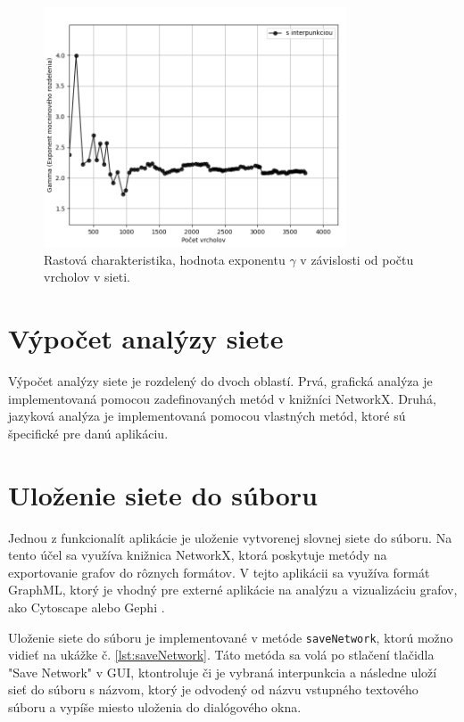 \begin{figure}
    \centerline{\includegraphics[width=0.8\textwidth]{images/growthPlot.png}}
    \caption[Rastová charakteristika, hodnota exponentu $\gamma$ v závislosti od počtu vrcholov v sieti.]{Rastová charakteristika, hodnota exponentu $\gamma$ v závislosti od počtu vrcholov v sieti.}
    \label{obr:growthPlot}
\end{figure}

\section{Výpočet analýzy siete}\label{sec:calculationOfNetworkAnalysis}

Výpočet analýzy siete je rozdelený do dvoch oblastí. Prvá, grafická analýza je implementovaná pomocou zadefinovaných
metód v knižníci NetworkX. Druhá, jazyková analýza je implementovaná pomocou vlastných metód,
ktoré sú špecifické pre danú aplikáciu.

\section{Uloženie siete do súboru}\label{sec:savingNetworkToFile}

Jednou z funkcionalít aplikácie je uloženie vytvorenej slovnej siete do súboru. Na tento účel sa využíva knižnica NetworkX,
ktorá poskytuje metódy na exportovanie grafov do rôznych formátov. V tejto aplikácii sa využíva formát GraphML, ktorý je
vhodný pre externé aplikácie na analýzu a vizualizáciu grafov, ako Cytoscape \cite{cytoscape_website}
alebo Gephi \cite{gephi_website}. 

Uloženie siete do súboru je implementované v metóde \texttt{saveNetwork}, ktorú možno
vidieť na ukážke č. \ref{lst:saveNetwork}. Táto metóda sa volá po stlačení tlačidla "Save Network" v GUI, ktontroluje či je vybraná
interpunkcia a následne uloží sieť do súboru s názvom, ktorý je odvodený od názvu vstupného textového súboru a vypíše miesto uloženia
do dialógového okna.

